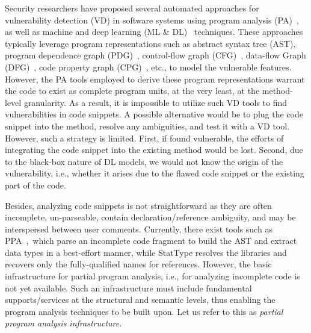 Security researchers have proposed several automated approaches for vulnerability detection (VD) in software systems using program analysis (PA)~\cite{FlawFinder,RATS,viega2000its4,Checkmarx,HPFortify,Coverity}, as well as machine and deep learning (ML \& DL)~\cite{fse21,chakraborty2020deep,zhou2019devign,li2018sysevr,li2018vuldeepecker} techniques. These approaches typically leverage program representations such as abstract syntax tree (AST), program dependence graph (PDG)~\cite{fse21,li2018vuldeepecker}, control-flow graph (CFG)~\cite{zhou2019devign}, data-flow Graph (DFG)~\cite{zhou2019devign}, code property graph (CPG)~\cite{chakraborty2020deep}, etc., to model the vulnerable features. 
However, the PA tools employed to derive these program representations warrant the code to exist as complete program units, at the very least, at the method-level granularity. As a result, it is impossible to utilize such VD tools to find vulnerabilities in code snippets. A possible alternative would be to plug the code snippet into the method, resolve any ambiguities, and test it with a VD tool. However, such a strategy is limited. First, if found vulnerable, the efforts of integrating the code snippet into the existing method would be lost. Second, due to the black-box nature of DL models, we would not know the origin of the vulnerability, i.e., whether it arises due to the flawed code snippet or the existing part of the code.

Besides, analyzing code snippets is not straightforward as they are often incomplete, un-parseable, contain declaration/reference ambiguity, and may be interspersed between user comments. Currently, there exist tools such as PPA~\cite{ppa08},~which parse an incomplete code fragment to build the AST and extract data types in a best-effort manner, while StatType \cite{icse18} resolves the libraries and recovers only the fully-qualified names for references. However, the basic infrastructure for partial program analysis, i.e., for analyzing incomplete code is not yet available. Such an infrastructure must include fundamental supports/services at the structural and semantic levels, thus enabling the program analysis techniques to be built upon. Let us refer to this as \textit{partial program analysis infrastructure}.



